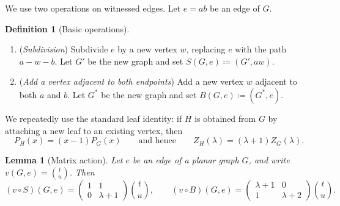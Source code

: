 \documentclass[A4paper,reqno,oneside,12pt]{amsart}
\theoremstyle{plain}
\newtheorem{lemma}[theorem]{Lemma}
\theoremstyle{definition}
\newtheorem{definition}[theorem]{Definition}
\begin{document}
We use two operations on witnessed edges.  Let $e=ab$ be an edge of $G$.

\begin{definition}[Basic operations]\label{def:ops-neg}
\begin{enumerate}
\item[(S)] (\emph{Subdivision}) Subdivide $e$ by a new vertex $w$, replacing $e$ with the path $a\!-\!w\!-\!b$.
Let $G'$ be the new graph and set $S(G,e)\coloneqq(G',aw)$.
\item[(B)] (\emph{Add a vertex adjacent to both endpoints}) Add a new vertex $w$ adjacent to both $a$ and $b$.
Let $G^\ast$ be the new graph and set $B(G,e)\coloneqq(G^\ast,e)$.
\end{enumerate}
\end{definition}

We repeatedly use the standard leaf identity: if $H$ is obtained from $G$ by attaching a new leaf to an existing vertex, then
\begin{equation}\label{eq:leaf}
P_H(x)=(x-1)P_G(x)\qquad\text{and hence}\qquad Z_H(\lambda)=(\lambda+1)Z_G(\lambda).
\end{equation}

\begin{lemma}[Matrix action]\label{lem:matrices-neg}
Let $e$ be an edge of a planar graph $G$, and write $v(G,e)=\binom{t}{u}$.
Then
\[
(v\circ S)(G,e)
=
\begin{pmatrix}
1 & 1\\
0 & \lambda+1
\end{pmatrix}
\binom{t}{u},
\qquad
(v\circ B)(G,e)
=
\begin{pmatrix}
\lambda+1 & 0\\
1 & \lambda+2
\end{pmatrix}
\binom{t}{u}.
\]
\end{lemma}
\end{document}
